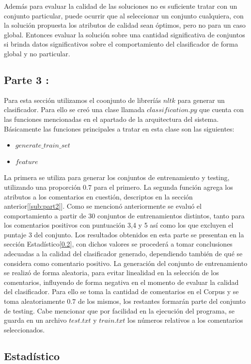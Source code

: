 \documentclass[12pt]{article}
\begin{document}
Además para evaluar la calidad de las soluciones no es suficiente tratar con un conjunto particular, puede ocurrir que al seleccionar un conjunto cualquiera, con la solución propuesta los atributos de calidad sean óptimos, pero no para un caso global. Entonces evaluar la solución sobre una cantidad significativa de conjuntos si brinda datos significativos sobre el comportamiento del clasificador de forma global y no particular.
\subsection{Parte 3 :}
Para esta sección utilizamos el coonjunto de libreríás $nltk$ para generar un clasificador. Para ello se creó una clase llamada $classification.py$ que cuenta con las funciones mencionadas en el apartado de la arquitectura del sistema. Básicamente las funciones principales a tratar en esta clase son las siguientes:
\begin{itemize}
  \item $generate\_train\_set$
  \item $feature$
\end{itemize}
La primera se utiliza para generar los conjuntos de entrenamiento y testing, utilizando una proporción $0.7$ para el primero.
La segunda función agrega los atributos a los comentarios en cuestión, descriptos en la sección anterior[\ref{sub:part2}].
Como se mencionó anteriormente se evaluó el comportamiento a partir de 30 conjuntos de entrenamientos distintos, tanto para los comentarios positivos con puntuación 3,4 y 5 así como los que excluyen el puntaje 3 del conjunto.
Los resultados obtenidos en esta parte se presentan en la sección Estadístico[\ref{sub:estad}], con dichos valores se procederá a tomar conclusiones adecuadas a la calidad del clasificador generado, dependiendo también de qué se considera como comentario positivo.
La generación del conjunto de entrenamiento se realizó de forma aleatoria, para evitar linealidad en la selección de los comentarios, influyendo de forma negativa en el momento de evaluar la calidad del clasificador. Para ello se toma la cantidad de comentarios en el Corpus y se toma aleatoriamente $0.7$ de los mismos, los restantes formarán parte del conjunto de testing. Cabe mencionar que por facilidad en la ejecución del programa, se guarda en un archivo $test.txt$ y $train.txt$ los números relativos a los comentarios seleccionados.
\subsection{Estadístico} \label{sub:estad}
\end{document}
